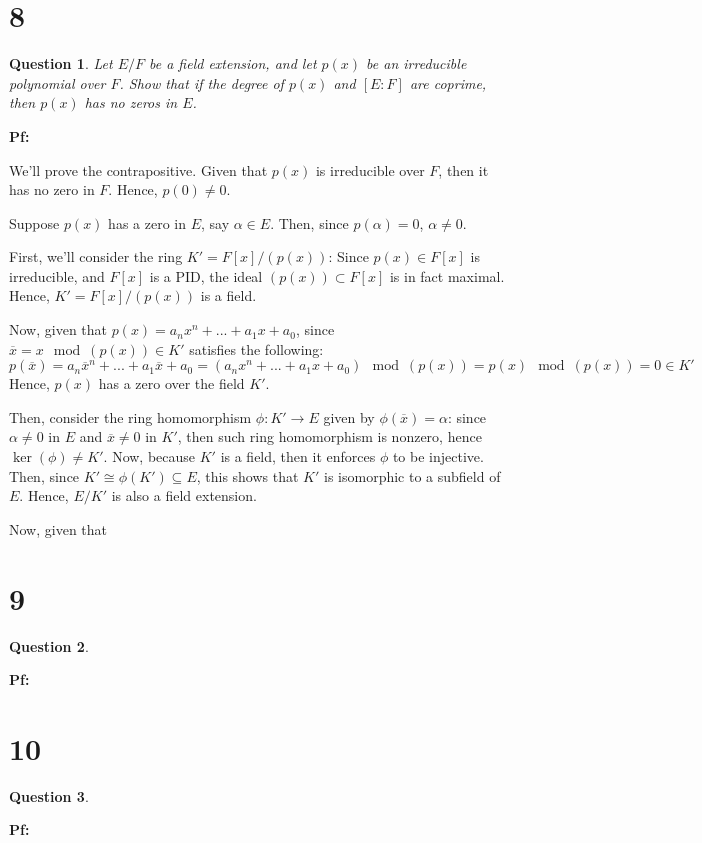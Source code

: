 \documentclass{article}
\newtheorem{question}{Question}
\begin{document}
\break

\section*{8}
\begin{myBox}[]{}
    \begin{question}
        Let $E/F$ be a field extension, and let $p(x)$ be an irreducible polynomial over $F$. 
        Show that if the degree of $p(x)$ and $[E:F]$ are coprime, then $p(x)$ has no zeros in $E$.
    \end{question}
\end{myBox}

\textbf{Pf:}

We'll prove the contrapositive. Given that $p(x)$ is irreducible over $F$, then it has no zero in $F$. Hence, $p(0)\neq 0$.

Suppose $p(x)$ has a zero in $E$, say $\alpha\in E$. Then, since $p(\alpha)=0$, $\alpha\neq 0$.

\hfil

First, we'll consider the ring $K'=F[x]/(p(x))$: Since $p(x)\in F[x]$ is irreducible, and $F[x]$ is a PID,
the ideal $(p(x))\subset F[x]$ is in fact maximal. Hence, $K'=F[x]/(p(x))$ is a field.

Now, given that $p(x)=a_nx^n+...+a_1x+a_0$, since $\overline{x} = x\mod (p(x))\in K'$ satisfies the following:
$$p(\overline{x})=a_n\overline{x}^n+...+a_1\overline{x}+a_0 = (a_nx^n+...+a_1x+a_0)\mod (p(x))=p(x)\mod (p(x))=0\in K'$$
Hence, $p(x)$ has a zero over the field $K'$.

\hfil

Then, consider the ring homomorphism $\phi:K'\rightarrow E$ given by $\phi(\overline{x})=\alpha$: since $\alpha\neq 0$ in $E$ and $\overline{x}\neq 0$ in $K'$,
then such ring homomorphism is nonzero, hence $\ker(\phi)\neq K'$. Now, because $K'$ is a field, then it enforces $\phi$ to be injective.
Then, since $K'\cong \phi(K')\subseteq E$, this shows that $K'$ is isomorphic to a subfield of $E$. Hence, $E/K'$ is also a field extension.

\hfil

Now, given that 

\break

\section*{9}
\begin{myBox}[]{}
    \begin{question}
        
    \end{question}
\end{myBox}

\textbf{Pf:}

\break

\section*{10}
\begin{myBox}[]{}
    \begin{question}
        
    \end{question}
\end{myBox}

\textbf{Pf:}
\end{document}
